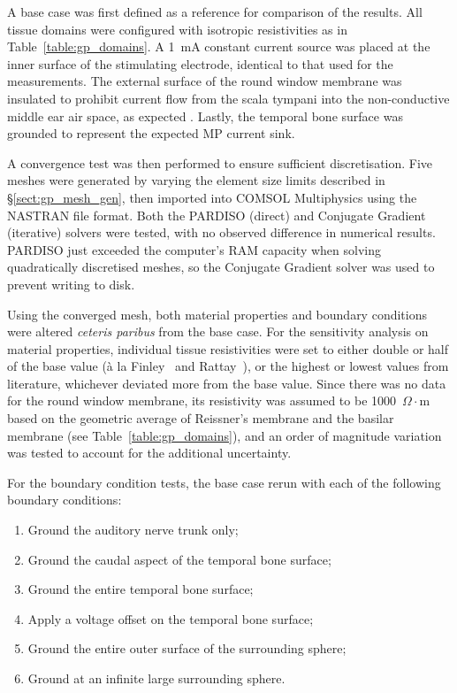 A base case was first defined as a reference for comparison of the \insilico{}
results. All tissue domains were configured with isotropic resistivities as
in Table~\ref{table:gp_domains}. A 1~mA constant current source was placed at
the inner surface of the stimulating electrode, identical to that used for the
\invivo{} measurements. The external surface of the round window membrane was
insulated to prohibit current flow from the scala tympani into the
non-conductive middle ear air space, as expected \invivo{}. Lastly, the temporal
bone surface was grounded to represent the expected MP current sink.

A convergence test was then performed to ensure sufficient discretisation. Five
meshes were generated by varying the element size limits described in
\S\ref{sect:gp_mesh_gen}, then imported into COMSOL Multiphysics using the
NASTRAN file format. Both the PARDISO (direct) and Conjugate Gradient
(iterative) solvers were tested, with no observed difference in numerical
results. PARDISO just exceeded the computer's RAM capacity when solving
quadratically discretised meshes, so the Conjugate Gradient solver was used to
prevent writing to disk.

Using the converged mesh, both material properties and boundary conditions were
altered \textit{ceteris paribus} from the base case. For the sensitivity
analysis on material properties, individual tissue resistivities were set to
either double or half of the base value (\`a la Finley~\cite{finley1989} and
Rattay~\cite{rattay2001model}), or the highest or lowest values from literature,
whichever deviated more from the base value. Since there was no data for the
round window membrane, its resistivity was assumed to be 1000~$ \Omega \cdot $m
based on the geometric average of Reissner's membrane and the basilar membrane
(see Table~\ref{table:gp_domains}), and an order of magnitude variation was
tested to account for the additional uncertainty.

For the boundary condition tests, the base case rerun with each of the
following boundary conditions:
\begin{enumerate}[after=\vspace{1.5\medskipamount}]
	\item Ground the auditory nerve trunk only;
	\item Ground the caudal aspect of the temporal bone surface;
	\item Ground the entire temporal bone surface;
	\item Apply a voltage offset on the temporal bone surface;
	\item Ground the entire outer surface of the surrounding sphere;
	\item Ground at an infinite large surrounding sphere.
\end{enumerate}

